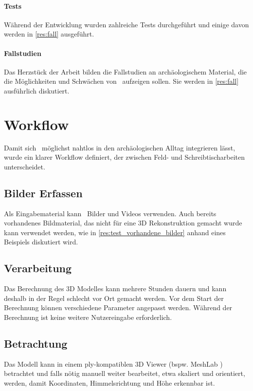 		\paragraph{Tests}
		Während der Entwicklung wurden zahlreiche Tests durchgeführt und einige davon werden in \autoref{res:fall} ausgeführt.
		
		\paragraph{Fallstudien}
		Das Herzstück der Arbeit bilden die Fallstudien an archäologischem Material, die die Möglichkeiten und Schwächen von \dronarch\ aufzeigen sollen. Sie werden in \autoref{res:fall} ausführlich diskutiert.
		
	\section{Workflow}
		Damit sich \dronarch\ möglichst nahtlos in den archäologischen Alltag integrieren lässt, wurde ein klarer Workflow definiert, der zwischen Feld- und Schreibtischarbeiten unterscheidet.
		
		\subsection{Bilder Erfassen}
			Als Eingabematerial kann \dronarch\ Bilder und Videos verwenden.
			Auch bereits vorhandenes Bildmaterial, das nicht für eine 3D Rekonstruktion gemacht wurde kann  verwendet werden, wie in \autoref{res:test_vorhandene_bilder} anhand eines Beispiels diskutiert wird.
		
		\subsection{Verarbeitung}
			Das Berechnung des 3D Modelles kann mehrere Stunden dauern und kann deshalb in der Regel schlecht vor Ort gemacht werden. Vor dem Start der Berechnung können verschiedene Parameter angepasst werden. %
			Während der Berechnung ist keine weitere Nutzereingabe erforderlich.
		
		\subsection{Betrachtung}
			Das Modell kann in einem ply-kompatiblen 3D Viewer (bspw. MeshLab ) betrachtet und falls nötig manuell weiter bearbeitet, etwa skaliert und orientiert, werden, damit Koordinaten, Himmelsrichtung und Höhe erkennbar ist.


